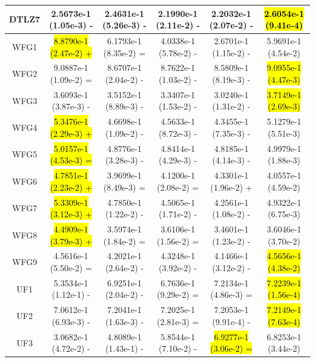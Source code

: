 \documentclass[journal]{IEEEtran}
\begin{document}
\begin{table}[tbp]
\begin{tabular}{cccccc}
        DTLZ7   & 2.5673e-1 (1.05e-3) -      & 2.4631e-1 (5.26e-3) -      & 2.1990e-1 (2.11e-2) - & 2.2032e-1 (2.07e-2) -      & \hl{2.6054e-1 (9.41e-4)}  \\
        \hline
        WFG1    & \hl{8.8790e-1 (2.47e-2) +} & 6.1793e-1 (8.35e-2) =      & 4.0338e-1 (5.78e-2) - & 2.6701e-1 (1.15e-2) -      & 5.9691e-1 (4.54e-2)       \\
        WFG2    & 9.0887e-1 (1.09e-2) =      & 8.6707e-1 (2.04e-2) -      & 8.7622e-1 (1.03e-2) - & 8.5809e-1 (8.19e-3) -      & \hl{9.0955e-1 (4.47e-3)}  \\
        WFG3    & 3.6093e-1 (3.87e-3) -      & 3.5152e-1 (8.89e-3) -      & 3.3407e-1 (1.53e-2) - & 3.0240e-1 (1.31e-2) -      & \hl{3.7149e-1 (2.69e-3)}  \\
        WFG4    & \hl{5.3476e-1 (2.29e-3) +} & 4.6698e-1 (1.09e-2) -      & 4.5633e-1 (8.72e-3) - & 4.3455e-1 (7.35e-3) -      & 5.1279e-1 (5.51e-3)       \\
        WFG5    & \hl{5.0157e-1 (4.53e-3) =} & 4.8776e-1 (3.28e-3) -      & 4.8414e-1 (4.29e-3) - & 4.8185e-1 (4.14e-3) -      & 4.9979e-1 (1.88e-3)       \\
        WFG6    & \hl{4.7851e-1 (2.23e-2) +} & 3.9699e-1 (8.49e-3) =      & 4.1200e-1 (2.08e-2) = & 4.3301e-1 (1.96e-2) +      & 4.0557e-1 (4.59e-2)       \\
        WFG7    & \hl{5.3309e-1 (3.12e-3) +} & 4.7850e-1 (1.22e-2) -      & 4.5065e-1 (1.71e-2) - & 4.2561e-1 (1.08e-2) -      & 4.9322e-1 (6.75e-3)       \\
        WFG8    & \hl{4.4909e-1 (3.79e-3) +} & 3.5974e-1 (1.84e-2) =      & 3.6106e-1 (1.56e-2) = & 3.4601e-1 (1.23e-2) -      & 3.6046e-1 (3.70e-2)       \\
        WFG9    & 4.5616e-1 (5.50e-2) =      & 4.2021e-1 (2.64e-2) -      & 4.3248e-1 (3.92e-2) - & 4.1466e-1 (3.12e-2) -      & \hl{4.5656e-1 (4.38e-2)}  \\
        \hline
        UF1     & 5.3534e-1 (1.12e-1) -      & 6.9251e-1 (2.04e-2) -      & 6.7636e-1 (9.29e-2) = & 7.2134e-1 (4.86e-3) =      & \hl{7.2239e-1 (1.56e-4)}  \\
        UF2     & 7.0612e-1 (6.93e-3) -      & 7.2041e-1 (1.63e-3) -      & 7.2025e-1 (2.81e-3) = & 7.2053e-1 (9.91e-4) -      & \hl{7.2149e-1 (7.63e-4)}  \\
        UF3     & 3.0682e-1 (4.72e-2) -      & 4.8089e-1 (1.43e-1) -      & 5.8544e-1 (7.10e-2) - & \hl{6.9277e-1 (3.06e-2) =} & 6.8253e-1 (3.44e-2)       \\

\end{tabular}
\end{table}
\end{document}
